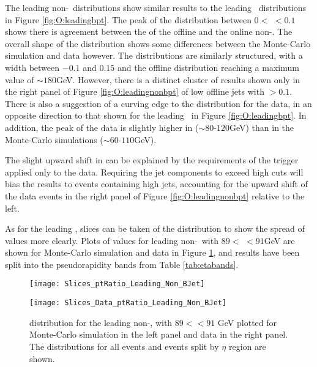 	The leading non-\bjet\ distributions show similar results to the leading \bjet\ distributions in Figure \ref{fig:O:leadingbpt}. The peak of the distribution between $0<$ \dptpt$<0.1$ shows there is agreement between the \pt of the offline and the online non-\bjet. The overall shape of the distribution shows some differences between the Monte-Carlo simulation and data however. The distributions are similarly structured, with a \dptpt width between $-0.1$ and $0.15$ and the \pt offline distribution reaching a maximum value of $\sim180$GeV. However, there is a distinct cluster of results shown only in the right panel of Figure \ref{fig:O:leadingnonbpt} of low \pt offline jets with \dptpt$>0.1$. There is also a suggestion of a curving edge to the distribution for the data, in an opposite direction to that shown for the leading \bjet\ in Figure \ref{fig:O:leadingbpt}. In addition, the peak of the data is slightly higher in \pt ($\sim80$-$120$GeV) than in the Monte-Carlo simulations ($\sim60$-$110$GeV).

	\newpage
	The slight upward shift in \pt can be explained by the \pt requirements of the trigger applied only to the data. Requiring the jet components to exceed high \pt cuts will bias the results to events containing high \pt jets, accounting for the upward \pt shift of the data events in the right panel of Figure \ref{fig:O:leadingnonbpt} relative to the left.

	As for the leading \bjet, slices can be taken of the \dptpt distribution to show the spread of values more clearly. Plots of \dptpt values for leading non-\bjets\ with $89<$ \pt$<91$GeV are shown for Monte-Carlo simulation and data in Figure \ref{fig:O:leadingnonbptslice}, and results have been split into the pseudorapidity bands from Table \ref{tab:etabands}.

	\begin{figure}[h]
		\centering

		\begin{minipage}[h]{0.48\linewidth}
			\texttt{[image: Slices\_ptRatio\_Leading\_Non\_BJet]}
		\end{minipage}
		\quad
		\begin{minipage}[h]{0.48\linewidth}
			\texttt{[image: Slices\_Data\_ptRatio\_Leading\_Non\_BJet]}
		\end{minipage}
		\caption[\dptpt distribution for leading non-\bjets\ with $89<$\pt$<91$ in data and Monte-Carlo simulations]{\dptpt distribution for the leading non-\bjet, with $89<$\pt$<91$ GeV plotted for Monte-Carlo simulation in the left panel and data in the right panel. The distributions for all events and events split by $\eta$ region are shown.}
		\label{fig:O:leadingnonbptslice}
	\end{figure}

